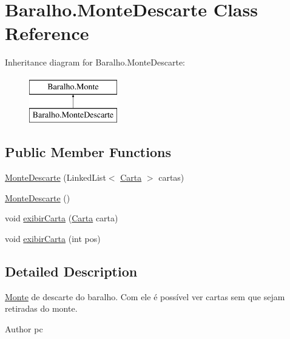 \hypertarget{class_baralho_1_1_monte_descarte}{
\section{\-Baralho.\-Monte\-Descarte \-Class \-Reference}
\label{class_baralho_1_1_monte_descarte}
}
\-Inheritance diagram for \-Baralho.\-Monte\-Descarte\-:\begin{figure}[H]
\begin{center}
\leavevmode
\includegraphics[height=2.000000cm]{class_baralho_1_1_monte_descarte}
\end{center}
\end{figure}
\subsection*{\-Public \-Member \-Functions}
\begin{DoxyCompactItemize}
\item 
\hyperlink{class_baralho_1_1_monte_descarte_a6dad15a6fd2ff4a535663173892936c7}{\-Monte\-Descarte} (\-Linked\-List$<$ \hyperlink{class_baralho_1_1_carta}{\-Carta} $>$ cartas)
\item 
\hyperlink{class_baralho_1_1_monte_descarte_aa36589f9e036fb890115e89e37b3b658}{\-Monte\-Descarte} ()
\item 
void \hyperlink{class_baralho_1_1_monte_descarte_a96b713dba347cd79bd944c0bef8a47ae}{exibir\-Carta} (\hyperlink{class_baralho_1_1_carta}{\-Carta} carta)
\item 
void \hyperlink{class_baralho_1_1_monte_descarte_a62c26b774387cec5611d723986c78ab0}{exibir\-Carta} (int pos)
\end{DoxyCompactItemize}


\subsection{\-Detailed \-Description}
\hyperlink{class_baralho_1_1_monte}{\-Monte} de descarte do baralho. \-Com ele é possível ver cartas sem que sejam retiradas do monte. \begin{DoxyAuthor}{\-Author}
pc 
\end{DoxyAuthor}


